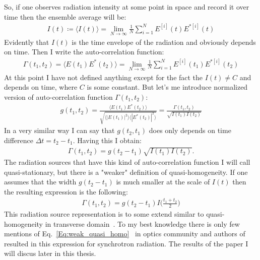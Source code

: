     So, if one observes radiation intensity at some point in space and record it over time then the ensemble average will be:
    \begin{align}
        I(t) \coloneqq \langle I(t) \rangle = \lim_{N\to\infty} \frac{1}{N}\sum_{i=1}^{N} E^{[i]}(t)E^{*[i]}(t)
    \end{align}
    Evidently that $I(t)$ is the time envelope of the radiation and obviously depends on time. Then I write the auto-correlation function:
    \begin{align}
        \Gamma(t_1, t_2) = \langle E(t_1)E^*(t_2) \rangle = \lim_{N\to\infty} \frac{1}{N}\sum_{i=1}^{N} E^{[i]}(t_1)E^{*[i]}(t_2)
    \end{align}
    At this point I have not defined anything except for the fact the $I(t) \neq C$ and depends on time, where $C$ is some constant. But let's me introduce normalized version of auto-correlation function $\Gamma(t_1, t_2)$:
    \begin{align}
        g(t_1, t_2) = \frac{\langle E(t_1)E^*(t_2)\rangle}{\sqrt{\langle |E(t_1)|^2\rangle \langle |E^*(t_2)|^2\rangle}} = \frac{\Gamma(t_1, t_2)}{\sqrt{ I(t_1) I(t_2)}}
    \end{align} 
    In a very similar way I can say that $g(t_2, t_1)$ does only depends on time difference $\Delta t = t_2 - t_1$. Having this I obtain:
    \begin{align}
        \Gamma(t_1, t_2) = g(t_2 - t_1) \sqrt{I(t_1) I(t_2)}.
        \label{Eq:Strict_quasi_homo}
    \end{align}
    The radiation sources that have this kind of auto-correlation function I will call quasi-stationary, but there is a "weaker" definition of quasi-homogeneity. If one assumes that the width $g(t_2 - t_1)$ is much smaller at the scale of $I(t)$ then the resulting expression is the following:
    \begin{align}
        \Gamma(t_1, t_2) = g(t_2 - t_1)I\bigg(\frac{t_1 + t_2}{2}\bigg)
        \label{Eq:weak_quasi_homo}
    \end{align}
    This radiation source representation is to some extend similar to quasi-homogeneity in transverse domain~\cite{goodman_statistical_2015}. To my best knowledge there is only few mentions of Eq.~\ref{Eq:weak_quasi_homo}~\cite{lajunen_quasi-stationary_2006, ahad_quasi-monochromatic_2017} in optics community and authors of~\cite{geloni_statistical_2006} resulted in this expression for synchrotron radiation. The results of the paper I will discus later in this thesis.
    
